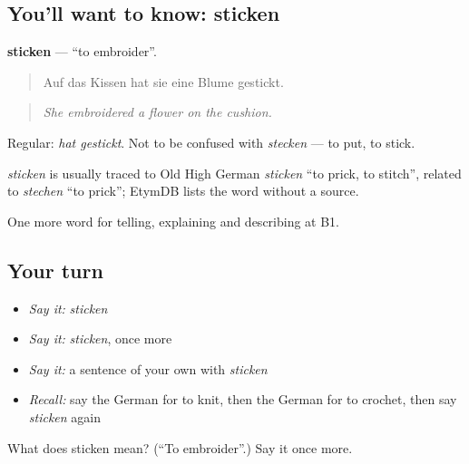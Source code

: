 \subsection*{You'll want to know: sticken}
\textbf{sticken} — \textquotedblleft{}to embroider\textquotedblright{}.

\begin{quote}
Auf das Kissen hat sie eine Blume gestickt.
\end{quote}

\begin{quote}
\emph{She embroidered a flower on the cushion.}
\end{quote}

Regular: \emph{hat gestickt}. Not to be confused with \emph{stecken} — to put, to stick.

\begin{cousinweb}
\emph{sticken} is usually traced to Old High German \emph{sticken} \textquotedblleft{}to prick, to stitch\textquotedblright{}, related to \emph{stechen} \textquotedblleft{}to prick\textquotedblright{}; EtymDB lists the word without a source.
\end{cousinweb}

\begin{grammarlens}[title={What you've built}]
One more word for telling, explaining and describing at B1.
\end{grammarlens}

\subsection*{Your turn}
\begin{itemize}
\raggedright
  \item \emph{Say it:} \emph{sticken}
  \item \emph{Say it:} \emph{sticken}, once more
  \item \emph{Say it:} a sentence of your own with \emph{sticken}
  \item \emph{Recall:} say the German for to knit, then the German for to crochet, then say \emph{sticken} again
\end{itemize}

\begin{tcolorbox}[breakable,colback=teal!4,colframe=teal!35!black,title={Before you move on}]
What does sticken mean? (\textquotedblleft{}To embroider\textquotedblright{}.) Say it once more.
\end{tcolorbox}
